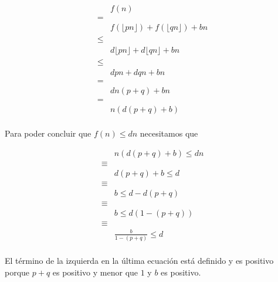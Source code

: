 \documentclass{article}
\newcommand{\piso}[1]{\lfloor #1 \rfloor}
\begin{document}
\begin{align*}
 & f(n) \\
 = & \\
 & f(\piso{pn}) + f(\piso{qn}) + bn \\
 \leq & \\
 & d\piso{pn} + d\piso{qn} + bn \\
 \leq & \\
 & dpn + dqn + bn \\
 = & \\
 & dn(p+q) + bn \\
 = & \\
 & n(d(p+q) + b) \\
\end{align*}

Para poder concluir que $f(n) \leq dn$ necesitamos que

\begin{align*}
 & n(d(p+q) + b) \leq dn \\
 \equiv & \\
 & d(p+q) + b \leq d \\
 \equiv & \\
 & b \leq d - d(p+q) \\
 \equiv & \\
 & b \leq d(1 - (p+q)) \\
 \equiv & \\
 & \frac{b}{1-(p+q)} \leq d \\
\end{align*}

El término de la izquierda en la última ecuación está definido y es positivo
porque $p+q$ es positivo y menor que $1$ y $b$ es positivo.

\section{}

\section{}

\section{}

\section{}
\end{document}
